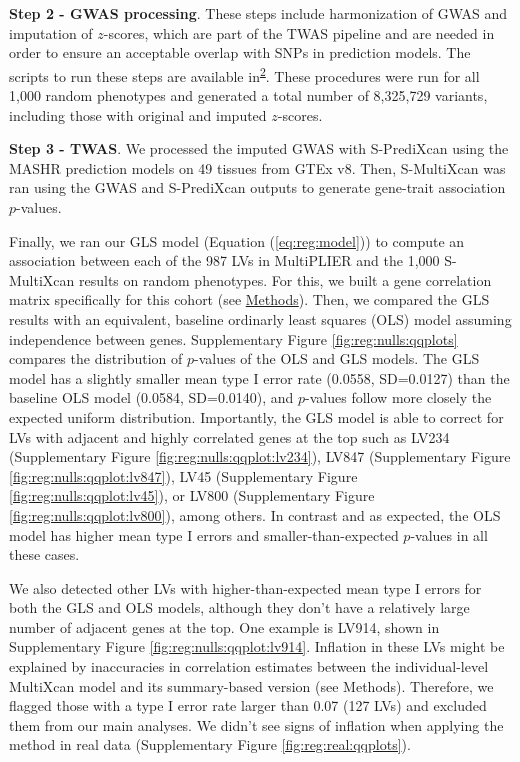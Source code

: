 \documentclass[
  a4paper,
]{article}
\begin{document}
\textbf{Step 2 - GWAS processing}. These steps include harmonization of GWAS and imputation of \(z\)-scores, which are part of the TWAS pipeline and are needed in order to ensure an acceptable overlap with SNPs in prediction models.
The scripts to run these steps are available in\textsuperscript{\protect\hyperlink{ref-GPHGnFRN}{2}}.
These procedures were run for all 1,000 random phenotypes and generated a total number of 8,325,729 variants, including those with original and imputed \(z\)-scores.

\textbf{Step 3 - TWAS}. We processed the imputed GWAS with S-PrediXcan using the MASHR prediction models on 49 tissues from GTEx v8.
Then, S-MultiXcan was ran using the GWAS and S-PrediXcan outputs to generate gene-trait association \(p\)-values.

Finally, we ran our GLS model (Equation (\ref{eq:reg:model})) to compute an association between each of the 987 LVs in MultiPLIER and the 1,000 S-MultiXcan results on random phenotypes.
For this, we built a gene correlation matrix specifically for this cohort (see \protect\hyperlink{sec:methods:reg}{Methods}).
Then, we compared the GLS results with an equivalent, baseline ordinarly least squares (OLS) model assuming independence between genes.
Supplementary Figure \ref{fig:reg:nulls:qqplots} compares the distribution of \(p\)-values of the OLS and GLS models.
The GLS model has a slightly smaller mean type I error rate (0.0558, SD=0.0127) than the baseline OLS model (0.0584, SD=0.0140), and \(p\)-values follow more closely the expected uniform distribution.
Importantly, the GLS model is able to correct for LVs with adjacent and highly correlated genes at the top such as LV234 (Supplementary Figure \ref{fig:reg:nulls:qqplot:lv234}), LV847 (Supplementary Figure \ref{fig:reg:nulls:qqplot:lv847}), LV45 (Supplementary Figure \ref{fig:reg:nulls:qqplot:lv45}), or LV800 (Supplementary Figure \ref{fig:reg:nulls:qqplot:lv800}), among others.
In contrast and as expected, the OLS model has higher mean type I errors and smaller-than-expected \(p\)-values in all these cases.

We also detected other LVs with higher-than-expected mean type I errors for both the GLS and OLS models, although they don't have a relatively large number of adjacent genes at the top.
One example is LV914, shown in Supplementary Figure \ref{fig:reg:nulls:qqplot:lv914}.
Inflation in these LVs might be explained by inaccuracies in correlation estimates between the individual-level MultiXcan model and its summary-based version (see Methods).
Therefore, we flagged those with a type I error rate larger than 0.07 (127 LVs) and excluded them from our main analyses.
We didn't see signs of inflation when applying the method in real data (Supplementary Figure \ref{fig:reg:real:qqplots}).
\end{document}
